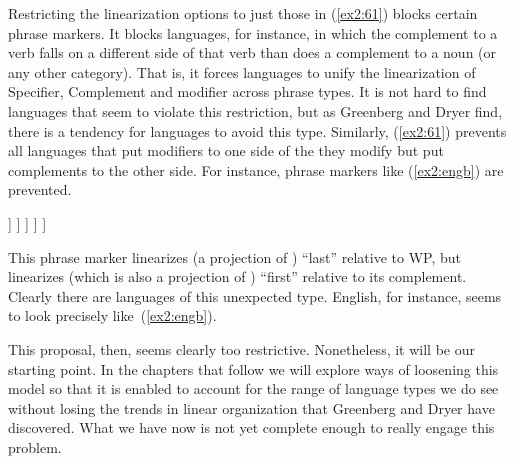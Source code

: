 Restricting the linearization options to just those in (\ref{ex2:61}) blocks certain phrase markers. It blocks languages, for instance, in which the complement to a verb falls on a different side of that verb than does a complement to a noun (or any other category). That is, it forces languages to unify the linearization of Specifier, Complement and modifier across phrase types. It is not hard to find languages that seem to violate this restriction, but as Greenberg and Dryer find, there is a tendency for languages to avoid this type. Similarly, (\ref{ex2:61}) prevents all languages that put modifiers to one side of the  they modify but put complements to the other side. For instance, phrase markers like (\ref{ex2:engb}) are prevented.
\begin{exe}
\ex \label{ex2:engb} 
\small
\begin{forest}
[IP
	[XP ]
	[\ibar{I} 
		[\obar{I} ]
		[VP
			[?? ]
			[ \ibar{V}
				[WP ]
				[\ibar{V}
					[\obar{V} ]
					[MP ]
				 ]
			]
		 ]
	 ]
]
\end{forest}
\end{exe}
This phrase marker linearizes  (a projection of ) ``last'' relative to WP, but linearizes  (which is also a projection of ) ``first'' relative to its complement. Clearly there are languages of this unexpected type. English, for instance, seems to look precisely like~(\ref{ex2:engb}).

This proposal, then, seems clearly too restrictive. Nonetheless, it will be our starting point. In the chapters that follow we will explore ways of loosening this model so that it is enabled to account for the range of language types we do see without losing the trends in linear organization that Greenberg and Dryer have discovered. What we have now is not yet complete enough to really engage this problem.

